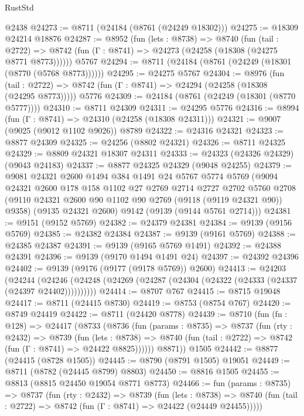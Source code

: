 \begin{lexlean}{RustStd}
\begin{coremodule}
    @2438
@24273 := @8711 (@24184 (@8761 (@24249 @18302)))
@24275 := @18309 @24214 @18876
@24287 := @8952
    (fun (lets : @8738) =>
    @8740
      (fun (tail : @2722) =>
      @8742 (fun (Γ : @8741) => @24273 (@24258 (@18308 (@24275 @8771 @8773))))))
    @5767
@24294 := @8711 (@24184 (@8761 (@24249 (@18301 (@8770 (@5768 @8773))))))
@24295 := @24275 @5767
@24304 := @8976
    (fun (tail : @2722) => @8742 (fun (Γ : @8741) => @24294 (@24258 (@18308 (@24295 @8773)))))
    @5776
@24309 := @24184 (@8761 (@24249 (@18301 (@8770 @5777))))
@24310 := @8711 @24309
@24311 := @24295 @5776
@24316 := @8994 (fun (Γ : @8741) => @24310 (@24258 (@18308 @24311)))
@24321 := @9007 (@9025 (@9012 @1102 @9026)) @8789
@24322 := @24316 @24321
@24323 := @8877 @24309
@24325 := @24256 (@8802 @24321)
@24326 := @8711 @24325
@24329 := @8809 @24321 @18307 @24311
@24333 := @24323 (@24326 @24329) (@9043 @24183)
@24337 := @8877 @24325 @24329 (@9048 @24255)
@24379 := @9081
    @24321
    @2600
    @1494
    @384
    @1491
    @24
    @5767
    @5774
    @5769
    (@9094
      @24321
      @2600
      @178
      @158
      @1102
      @27
      @2769
      @2714
      @2727
      @2702
      @5760
      @2708
      (@9110 @24321 @2600 @90 @1102 @90 @2769 (@9118 (@9119 @24321 @90)) @9358)
      (@9135 @24321 @2600)
      @9142
      (@9139 (@9144 @5761 @2714)))
@24381 := @9151 (@9152 @5769)
@24382 := @24379 @24381
@24384 := @9139 (@9156 @5769)
@24385 := @24382 @24384
@24387 := @9139 (@9161 @5769)
@24388 := @24385 @24387
@24391 := @9139 (@9165 @5769 @1491)
@24392 := @24388 @24391
@24396 := @9139 (@9170 @1494 @1491 @24)
@24397 := @24392 @24396
@24402 := @9139 (@9176 (@9177 (@9178 @5769)) @2600)
@24413 := @24203
    (@24244 (@24246 (@24248 (@24269 (@24287 (@24304 (@24322 (@24333 (@24337 (@24397 @24402))))))))))
@24414 := @8707 @767
@24415 := @8715 @19048
@24417 := @8711 (@24415 @8730)
@24419 := @8753 (@8754 @767)
@24420 := @8749 @24419
@24422 := @8711 (@24420 @8778)
@24439 := @8710
    (fun (fn : @128) =>
    @24417
      (@8733
        (@8736
          (fun (params : @8735) =>
          @8737
            (fun (rty : @2432) =>
            @8739
              (fun (lets : @8738) =>
              @8740 (fun (tail : @2722) => @8742 (fun (Γ : @8741) => @24422 @8825))))))
        @8871))
    @1505
@24442 := @8877 (@24415 (@8728 @1505))
@24445 := @8790 (@8791 @1505) @19051
@24449 := @8711 (@8782 (@24445 @8799) @8803)
@24450 := @8816 @1505
@24455 := @8813 (@8815 @24450 @19054 @8771 @8773)
@24466 := fun (params : @8735) =>
  @8737
    (fun (rty : @2432) =>
    @8739
      (fun (lets : @8738) =>
      @8740 (fun (tail : @2722) => @8742 (fun (Γ : @8741) => @24422 (@24449 @24455)))))

\end{coremodule}
\end{lexlean}
